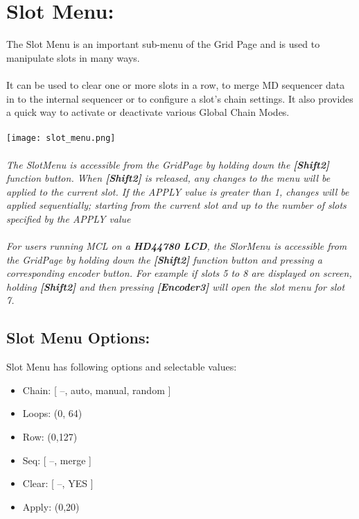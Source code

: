 \chapter{Slot Menu:}

The Slot Menu is an important sub-menu of the Grid Page and is used to manipulate slots in many ways.\\\\
It can be used to clear one or more slots in a row, to merge  MD sequencer data in to the internal sequencer or to configure a slot's chain settings. It also provides a quick way to activate or deactivate various Global Chain Modes.
\\\\
\texttt{[image: slot\_menu.png]}
\\\\
\textit{The SlotMenu is accessible from the GridPage by holding down the  \textbf{[Shift2]} function 
button. When  \textbf{[Shift2]}  is released, any changes to the menu will be applied to the current slot. If the APPLY value is greater than 1, changes will be applied sequentially; starting from the current slot and up to the number of slots specified by the APPLY value}
\\\\
\textit{For users running MCL on a \textbf{HD44780 LCD}, the SlorMenu  is accessible from the GridPage by holding down the  \textbf{[Shift2]} function button and pressing a corresponding encoder button. For example if slots 5 to 8 are displayed on screen, holding  \textbf{[Shift2]} and then pressing \textbf{[Encoder3]} will open the slot menu for slot 7.}

\section{Slot Menu Options:}
Slot Menu has following options and selectable values:
\begin{itemize}

\item{Chain: [ --, auto, manual, random ]}


\item{Loops:  (0, 64)}
\item{Row:    (0,127)}
\item{Seq: [ --, merge ]}
\item{Clear: [ --, YES ]}
\item{Apply: (0,20)}

\end{itemize}

